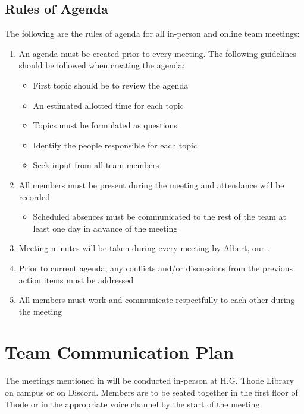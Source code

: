 \documentclass[12pt,letterpaper]{article}
\begin{document}
\subsection{Rules of Agenda}
The following are the rules of agenda for all in-person and online team
meetings:
\begin{enumerate}
    \item An agenda must be created prior to every meeting. The following
    guidelines should be followed when creating the agenda:
    \begin{itemize}
        \item First topic should be to review the agenda
        \item An estimated allotted time for each topic
        \item Topics must be formulated as questions
        \item Identify the people responsible for each topic
        \item Seek input from all team members
    \end{itemize}
    \item All members must be present during the meeting and attendance will be
    recorded
    \begin{itemize}
        \item Scheduled absences must be communicated to the rest of the team at
        least one day in advance of the meeting
    \end{itemize}
    \item Meeting minutes will be taken during every meeting by Albert, our
    .
    \item Prior to current agenda, any conflicts and/or discussions from the
    previous action items must be addressed 
    \item All members must work and communicate respectfully to each other
    during the meeting
\end{enumerate}

\section{Team Communication Plan}
The meetings mentioned in  will be conducted in-person
at H.G. Thode Library on campus or on Discord. Members are to be seated together
in the first floor of Thode or in the appropriate voice channel by the start of
the meeting. 
\end{document}
